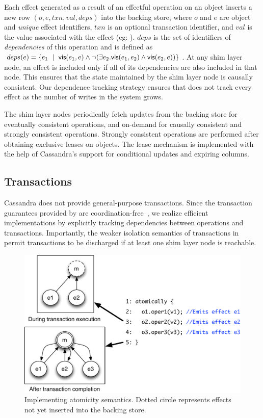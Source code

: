 Each effect generated as a result of an effectful operation on an object
inserts a new row $(o,\allowbreak e,\allowbreak txn,\allowbreak val,
\allowbreak deps)$ into the backing store, where $o$ and $e$ are object and
\emph{unique} effect identifiers, $txn$ is an optional transaction identifier,
and $val$ is the value associated with the effect (eg: ).
$deps$ is the set of identifiers of \emph{dependencies} of this operation and
is defined as $deps(e) = \{e_1 ~\mid~ {\normalfont \textsf{vis}(e_1,e)} \wedge \neg(\exists
e_2.{\normalfont \textsf{vis}(e_1,e_2)} \wedge {\normalfont \textsf{vis}(e_2,e)})\}$. At any shim layer node, an effect
is included only if all of its dependencies are also included in that node.
This ensures that the state maintained by the shim layer node is causally
consistent. Our dependence tracking strategy ensures that \name does not track
every effect as the number of writes in the system grows.

The shim layer nodes periodically fetch updates from the backing store for
eventually consistent operations, and on-demand for causally consistent and
strongly consistent operations. Strongly consistent operations are performed
after obtaining exclusive leases on objects. The lease mechanism is implemented
with the help of Cassandra's support for conditional updates and expiring
columns.

\subsection{Transactions}

Cassandra does not provide general-purpose transactions. Since the transaction
guarantees provided by \name are coordination-free~\cite{BailisHAT}, we realize
efficient implementations by explicitly tracking dependencies between
operations and transactions. Importantly, the weaker isolation semantics of
transactions in \name permit transactions to be discharged if at least one shim
layer node is reachable.

\begin{figure}
\begin{center}
\includegraphics[width=\columnwidth]{Figures/AtomicityImpl}
\end{center}
\caption{Implementing atomicity semantics. Dotted circle represents effects not
yet inserted into the backing store.}
\label{fig:atomicity_impl}
\end{figure}

